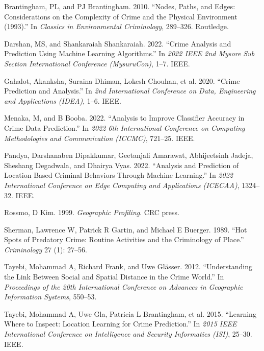 \documentclass[conference,final,]{IEEEtran}
\newlength{\cslhangindent}
\newenvironment{CSLReferences}[2] %
 {\begin{list}{}{%
  \setlength{\itemindent}{0pt}
  \setlength{\leftmargin}{0pt}
  \setlength{\parsep}{0pt}
  \ifodd #1
   \setlength{\leftmargin}{\cslhangindent}
   \setlength{\itemindent}{-1\cslhangindent}
  \fi
  \setlength{\itemsep}{#2\baselineskip}}}
 {\end{list}}
\begin{document}
\label{refs}
\begin{CSLReferences}{1}{0}
Brantingham, PL, and PJ Brantingham. 2010. {``Nodes, Paths, and Edges:
Considerations on the Complexity of Crime and the Physical Environment
(1993).''} In \emph{Classics in Environmental Criminology}, 289--326.
Routledge.

Darshan, MS, and Shankaraiah Shankaraiah. 2022. {``Crime Analysis and
Prediction Using Machine Learning Algorithms.''} In \emph{2022 IEEE 2nd
Mysore Sub Section International Conference (MysuruCon)}, 1--7. IEEE.

Gahalot, Akanksha, Suraina Dhiman, Lokesh Chouhan, et al. 2020. {``Crime
Prediction and Analysis.''} In \emph{2nd International Conference on
Data, Engineering and Applications (IDEA)}, 1--6. IEEE.

Menaka, M, and B Booba. 2022. {``Analysis to Improve Classifier Accuracy
in Crime Data Prediction.''} In \emph{2022 6th International Conference
on Computing Methodologies and Communication (ICCMC)}, 721--25. IEEE.

Pandya, Darshanaben Dipakkumar, Geetanjali Amarawat, Abhijeetsinh
Jadeja, Sheshang Degadwala, and Dhairya Vyas. 2022. {``Analysis and
Prediction of Location Based Criminal Behaviors Through Machine
Learning.''} In \emph{2022 International Conference on Edge Computing
and Applications (ICECAA)}, 1324--32. IEEE.

Rossmo, D Kim. 1999. \emph{Geographic Profiling}. CRC press.

Sherman, Lawrence W, Patrick R Gartin, and Michael E Buerger. 1989.
{``Hot Spots of Predatory Crime: Routine Activities and the Criminology
of Place.''} \emph{Criminology} 27 (1): 27--56.

Tayebi, Mohammad A, Richard Frank, and Uwe Glässer. 2012.
{``Understanding the Link Between Social and Spatial Distance in the
Crime World.''} In \emph{Proceedings of the 20th International
Conference on Advances in Geographic Information Systems}, 550--53.

Tayebi, Mohammad A, Uwe Gla, Patricia L Brantingham, et al. 2015.
{``Learning Where to Inspect: Location Learning for Crime Prediction.''}
In \emph{2015 IEEE International Conference on Intelligence and Security
Informatics (ISI)}, 25--30. IEEE.


\end{CSLReferences}
\end{document}

